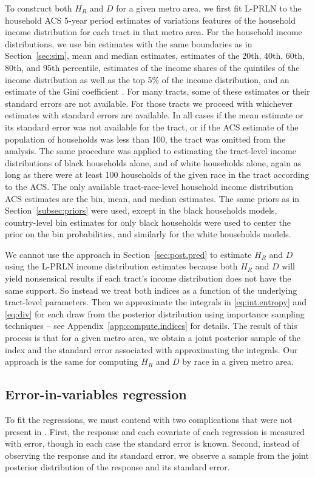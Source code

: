 \documentclass[12pt]{article}
\begin{document}
To construct both $H_R$ and $D$ for a given metro area, we first fit L-PRLN to the household ACS 5-year period estimates of variations features of the household income distribution for each tract in that metro area. For the household income distributions, we use bin estimates with the same boundaries as in Section~\ref{sec:sim}, mean and median estimates, estimates of the 20th, 40th, 60th, 80th, and 95th percentile, estimates of the income shares of the quintiles of the income distribution as well as the top 5\% of the income distribution, and an estimate of the Gini coefficient \citep{acs2018quintiles,acs2018shares,acs2018gini,acs2018income,acs2018financial}. For many tracts, some of these estimates or their standard errors are not available. For those tracts we proceed with whichever estimates with standard errors are available. In all cases if the mean estimate or its standard error was not available for the tract, or if the ACS estimate of the population of households was less than 100, the tract was omitted from the analysis. The same procedure was applied to estimating the tract-level income distributions of black households alone, and of white households alone, again as long as there were at least 100 households of the given race in the tract according to the ACS. The only available tract-race-level household income distribution ACS estimates are the bin, mean, and median estimates. The same priors as in Section~\ref{subsec:priors} were used, except in the black households models, country-level bin estimates for only black households were used to center the prior on the bin probabilities, and similarly for the white households models.

We cannot use the approach in Section~\ref{sec:post.pred} to estimate $H_R$ and $D$ using the L-PRLN income distribution estimates because both $H_R$ and $D$ will yield nonsensical results if each tract's income distribution does not have the same support. So instead we treat both indices as a function of the underlying tract-level parameters. Then we approximate the integrals in \eqref{eq:int.entropy} and \eqref{eq:div} for each draw from the posterior distribution using importance sampling techniques -- see Appendix~\ref{app:compute.indices} for details. The result of this process is that for a given metro area, we obtain a joint posterior sample of the index and the standard error associated with approximating the integrals. Our approach is the same for computing $H_R$ and $D$ by race in a given metro area.

\subsection{Error-in-variables regression}\label{sec:eiv}
To fit the regressions, we must contend with two complications that were not present in \citet{reardon2011income}. First, the response and each covariate of each regression is measured with error, though in each case the standard error is known. Second, instead of observing the response and its standard error, we observe a sample from the joint posterior distribution of the response and its standard error. 
\end{document}
